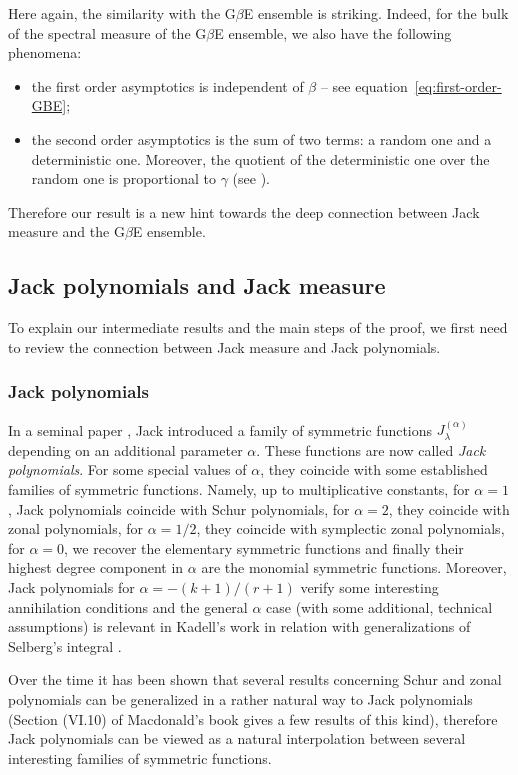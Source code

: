 \documentclass[11pt]{amsart}
\theoremstyle{plain}
\theoremstyle{remark}
\begin{document}
Here again, the similarity with the G$\beta$E ensemble is striking.
Indeed, for the bulk of the spectral measure of the G$\beta$E ensemble, we also have the following phenomena:
\begin{itemize}
    \item the first order asymptotics is independent of $\beta$ -- see equation~\eqref{eq:first-order-GBE};
    \item the second order asymptotics is the sum of two terms: 
        a random one and a deterministic one.
        Moreover, the quotient of the deterministic one over the random one is proportional to
        $\gamma$ (see \cite[Theorem 1.2]{DumitriuEdelman2006}).
\end{itemize}
Therefore our result is a new hint towards the deep connection between Jack measure
and the G$\beta$E ensemble.



\subsection{Jack polynomials and Jack measure}
To explain our intermediate results
and the main steps of the proof,
we first need to review the connection between Jack measure and Jack polynomials.

\subsubsection{Jack polynomials}
In a seminal paper \cite{Jack1970/1971},
Jack introduced a family of symmetric functions
$J^{(\alpha)}_\lambda$ depending on an additional parameter
$\alpha$. These functions are now called \emph{Jack polynomials}.
For some special values of $\alpha$, they coincide with some
established families of symmetric functions. Namely, up to multiplicative
constants, for $\alpha=1$, Jack polynomials coincide with Schur polynomials, for
$\alpha=2$, they coincide with zonal polynomials, for $\alpha=1/2$, they
coincide with symplectic zonal polynomials, for $\alpha = 0$, we recover the
elementary symmetric functions and finally their highest degree component in
$\alpha$ are the monomial symmetric functions. Moreover, Jack polynomials for
$\alpha=-(k+ 1)/(r+ 1)$ verify some interesting annihilation conditions \cite{Feigin2002}
and the general $\alpha$ case (with some additional, technical assumptions)
is relevant in Kadell's work in relation with generalizations of
Selberg's integral \cite{Kadell1997}.

Over the time it has been shown that several
results concerning Schur and zonal polynomials can be generalized in a rather
natural way to Jack polynomials (Section (VI.10) of Macdonald's book \cite{Macdonald1995}
gives a few results of this kind), therefore Jack polynomials
can be viewed as a natural
interpolation between several interesting families of symmetric functions.
\end{document}
